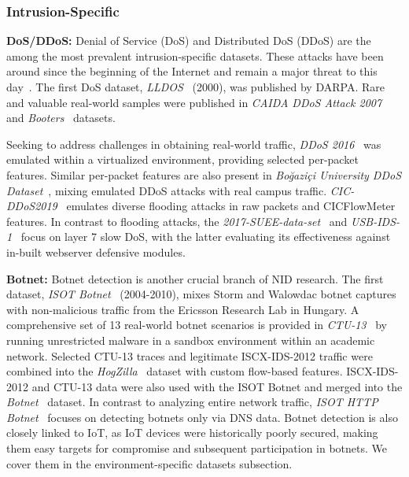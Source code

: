 \subsubsection{Intrusion-Specific}

\textbf{DoS/DDoS:} Denial of Service (DoS) and Distributed DoS (DDoS) are the among the most prevalent intrusion-specific datasets. These attacks have been around since the beginning of the Internet and remain a major threat to this day~\cite{mittal2023_dl_detecting_ddos}. The first DoS dataset, \emph{LLDOS}~\cite{haines2000_darpa2000} (2000), was published by DARPA. Rare and valuable real-world samples were published in \emph{CAIDA DDoS Attack 2007}~\cite{caida_ddos_attack2007} and \emph{Booters}~\cite{santanna2015_booters} datasets.

Seeking to address challenges in obtaining real-world traffic, \emph{DDoS 2016}~\cite{alkasassbeh2016_ddos2016} was emulated within a virtualized environment, providing selected per-packet features. Similar per-packet features are also present in \emph{Bo\u{g}azi\c{c}i University DDoS Dataset}~\cite{erhan2020_bogazici_ddos_dataset}, mixing emulated DDoS attacks with real campus traffic. \emph{CIC-DDoS2019}~\cite{sharafaldin2019_cic_ddos2019} emulates diverse flooding attacks in raw packets and CICFlowMeter features. In contrast to flooding attacks, the \emph{2017-SUEE-data-set}~\cite{lukeseder2017_suee_dataset} and \emph{USB-IDS-1}~\cite{catillo2021_usbids1} focus on layer 7 slow DoS, with the latter evaluating its effectiveness against in-built webserver defensive modules.

\textbf{Botnet:}
Botnet detection is another crucial branch of NID research. The first dataset, \emph{ISOT Botnet}~\cite{saad2011_isot_botnet} (2004-2010), mixes Storm and Walowdac botnet captures with non-malicious traffic from the Ericsson Research Lab in Hungary. A comprehensive set of 13 real-world botnet scenarios is provided in \emph{CTU-13}~\cite{garcia2014_ctu13} by running unrestricted malware in a sandbox environment within an academic network. Selected CTU-13 traces and legitimate ISCX-IDS-2012 traffic were combined into the \emph{HogZilla}~\cite{hogzilla2012_hogzilla_dataset} dataset with custom flow-based features. ISCX-IDS-2012 and CTU-13 data were also used with the ISOT Botnet and merged into the \emph{Botnet}~\cite{beigi2014_botnet_dataset} dataset. In contrast to analyzing entire network traffic, \emph{ISOT HTTP Botnet}~\cite{alenazi2017_isot_http_botnet} focuses on detecting botnets only via DNS data. Botnet detection is also closely linked to IoT, as IoT devices were historically poorly secured, making them easy targets for compromise and subsequent participation in botnets. We cover them in the environment-specific datasets subsection.

